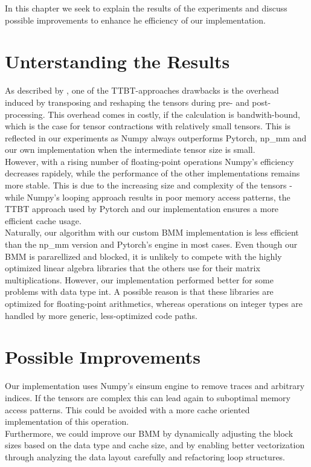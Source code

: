 In this chapter we seek to explain the results of the experiments and discuss possible improvements to enhance he efficiency of our implementation.\\

\section{Unterstanding the Results}
As described by \textcite{springer}, one of the TTBT-approaches drawbacks is the overhead induced by transposing and reshaping the tensors during pre- and post-processing. This overhead comes in costly, if the calculation is bandwith-bound, which is the case for tensor contractions with relatively small tensors. This is reflected in our experiments as Numpy always outperforms Pytorch, np\_mm and our own implementation when the intermediate tensor size is small.\\
However, with a rising number of floating-point operations Numpy's efficiency decreases rapidely, while the performance of the other implementations remains more stable. 
This is due to the increasing size and complexity of the tensors - while Numpy's looping approach results in poor memory access patterns, the TTBT approach used by Pytorch and our implementation ensures a more efficient cache usage.\\

\noindent Naturally, our algorithm with our custom BMM implementation is less efficient than the np\_mm version and Pytorch's engine in most cases. Even though our BMM is pararellized and blocked, it is unlikely to compete with the highly optimized linear algebra libraries that the others use for their matrix multiplications. However, our implementation performed better for some problems with data type int. A possible reason is that these libraries are optimized for floating-point arithmetics, whereas operations on integer types are handled by more generic, less-optimized code paths.\\

\section{Possible Improvements}
Our implementation uses Numpy's einsum engine to remove traces and arbitrary indices. If the tensors are complex this can lead again to suboptimal memory access patterns. This could be avoided with a more cache oriented implementation of this operation.\\
Furthermore, we could improve our BMM by dynamically adjusting the block sizes based on the data type and cache size, and by enabling better vectorization through analyzing the data layout carefully and refactoring loop structures.
